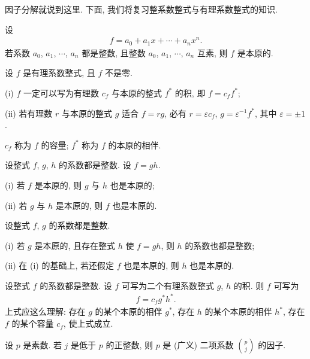 因子分解就说到这里. 下面, 我们将复习整系数整式与有理系数整式的知识.

\begin{definition}
    设
    \begin{align*}
        f = a_0 + a_1 x + \cdots + a_n x^n.
    \end{align*}
    若系数 $a_0$, $a_1$, $\cdots$, $a_n$ 都是整数, 且整数 $a_0$, $a_1$, $\cdots$, $a_n$ 互素, 则 $f$ 是本原的.
\end{definition}

\begin{proposition}
    设 $f$ 是有理系数整式, 且 $f$ 不是零.

    (i) $f$ 一定可以写为有理数 $c_f$ 与本原的整式 $f^{\ast}$ 的积, 即 $f = c_f f^{\ast}$;

    (ii) 若有理数 $r$ 与本原的整式 $g$ 适合 $f = rg$, 必有 $r = \varepsilon c_f$, $g = \varepsilon^{-1} f^{\ast}$, 其中 $\varepsilon = \pm 1$.

    $c_f$ 称为 $f$ 的容量; $f^{\ast}$ 称为 $f$ 的本原的相伴.
\end{proposition}

\begin{proposition}
    设整式 $f$, $g$, $h$ 的系数都是整数. 设 $f = gh$.

    (i) 若 $f$ 是本原的, 则 $g$ 与 $h$ 也是本原的;

    (ii) 若 $g$ 与 $h$ 是本原的, 则 $f$ 也是本原的.
\end{proposition}

\begin{proposition}
    设整式 $f$, $g$ 的系数都是整数.

    (i) 若 $g$ 是本原的, 且存在整式 $h$ 使 $f = gh$, 则 $h$ 的系数也都是整数;

    (ii) 在 (i) 的基础上, 若还假定 $f$ 也是本原的, 则 $h$ 也是本原的.
\end{proposition}

\begin{proposition}
    设整式 $f$ 的系数都是整数. 设 $f$ 可写为二个有理系数整式 $g$, $h$ 的积. 则 $f$ 可写为
    \begin{align*}
        f = c_f g^{\ast} h^{\ast}.
    \end{align*}
    上式应这么理解: 存在 $g$ 的某个本原的相伴 $g^{\ast}$, 存在 $h$ 的某个本原的相伴 $h^{\ast}$, 存在 $f$ 的某个容量 $c_f$, 使上式成立.
\end{proposition}

\begin{proposition}
    设 $p$ 是素数. 若 $j$ 是低于 $p$ 的正整数, 则 $p$ 是 (广义) 二项系数 $\binom{p}{j}$ 的因子.
\end{proposition}

